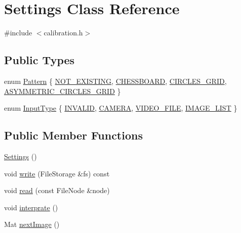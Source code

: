 \hypertarget{classSettings}{\section{Settings Class Reference}
\label{classSettings}
}


{\ttfamily \#include $<$calibration.\-h$>$}

\subsection*{Public Types}
\begin{DoxyCompactItemize}
\item 
enum \hyperlink{classSettings_a0e7117abd9427a6f8bc1d1d8d456b5c8}{Pattern} \{ \hyperlink{classSettings_a0e7117abd9427a6f8bc1d1d8d456b5c8ad2f421ce100bd7e0302b17bda1a74eb9}{N\-O\-T\-\_\-\-E\-X\-I\-S\-T\-I\-N\-G}, 
\hyperlink{classSettings_a0e7117abd9427a6f8bc1d1d8d456b5c8ae96aa2d60b4a554a215524a05b32908e}{C\-H\-E\-S\-S\-B\-O\-A\-R\-D}, 
\hyperlink{classSettings_a0e7117abd9427a6f8bc1d1d8d456b5c8a79472d1c69f8ed7aa1b55f908b136f68}{C\-I\-R\-C\-L\-E\-S\-\_\-\-G\-R\-I\-D}, 
\hyperlink{classSettings_a0e7117abd9427a6f8bc1d1d8d456b5c8a2cea29ee5896f2cb4cc64df25fd2375b}{A\-S\-Y\-M\-M\-E\-T\-R\-I\-C\-\_\-\-C\-I\-R\-C\-L\-E\-S\-\_\-\-G\-R\-I\-D}
 \}
\item 
enum \hyperlink{classSettings_a5afe85d24b071973a7f248c05386f7f4}{Input\-Type} \{ \hyperlink{classSettings_a5afe85d24b071973a7f248c05386f7f4adb44130895aedc32a119565eb6d61bed}{I\-N\-V\-A\-L\-I\-D}, 
\hyperlink{classSettings_a5afe85d24b071973a7f248c05386f7f4aba4cc7726878c8913831f0ea6360fa05}{C\-A\-M\-E\-R\-A}, 
\hyperlink{classSettings_a5afe85d24b071973a7f248c05386f7f4ac9fd97535bc651249f9eed1fddf2d36b}{V\-I\-D\-E\-O\-\_\-\-F\-I\-L\-E}, 
\hyperlink{classSettings_a5afe85d24b071973a7f248c05386f7f4a292bd2e5ba912a92ace1606e366edc4d}{I\-M\-A\-G\-E\-\_\-\-L\-I\-S\-T}
 \}
\end{DoxyCompactItemize}
\subsection*{Public Member Functions}
\begin{DoxyCompactItemize}
\item 
\hyperlink{classSettings_ab7169a6eefce79566dd07db3b1e5e967}{Settings} ()
\item 
void \hyperlink{classSettings_ae320e2f94798ba2de400f73a8110d412}{write} (File\-Storage \&fs) const 
\item 
void \hyperlink{classSettings_a2d7841f8441095032e0f3b7d20adfd3f}{read} (const File\-Node \&node)
\item 
void \hyperlink{classSettings_ac01c17bf3536e296f1076e50cdcb00cd}{interprate} ()
\item 
Mat \hyperlink{classSettings_a7701462e928f2425b342440fba9973e5}{next\-Image} ()
\end{DoxyCompactItemize}
